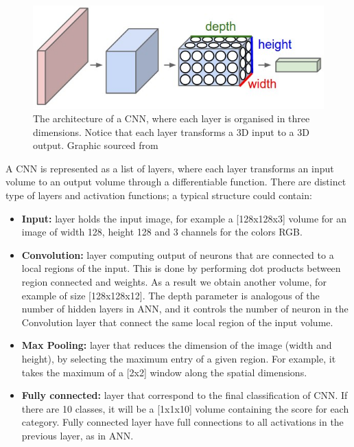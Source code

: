 \begin{figure}[htbp]
	\centering
	\includegraphics[scale=0.5]{cnn.png}
	\caption{The architecture of a CNN, where each layer is organised in three dimensions. Notice that each layer transforms a 3D input to a 3D output. Graphic sourced from \cite{CS231n}}
	\label{CNN}
\end{figure}
\vspace{0.3cm}
A CNN is represented as a list of layers, where each layer transforms an input volume to an output volume through a differentiable function. There are distinct type of layers and activation functions; a typical structure could contain:
\begin{itemize}
	\item \textbf{Input:} layer holds the input image, for example a [128x128x3] volume for an image of width 128, height 128 and 3 channels for the colors RGB. 
	\item \textbf{Convolution:} layer computing output of neurons that are connected to a local regions of the input. This is done by performing dot products between region connected and weights. As a result we obtain another volume, for example of size [128x128x12]. The depth parameter is analogous of the number of hidden layers in ANN, and it controls the number of neuron in the Convolution layer that connect the same local region of the input volume. 
	\item \textbf{Max Pooling:} layer that reduces the dimension of the image (width and height), by selecting the maximum entry of a given region. For example, it takes the maximum of a [2x2] window along the spatial dimensions.
	\item \textbf{Fully connected:} layer that correspond to the final classification of CNN. If there are 10 classes, it will be a [1x1x10] volume containing the score for each category. Fully connected layer have full connections to all activations in the previous layer, as in ANN. 
\end{itemize}

